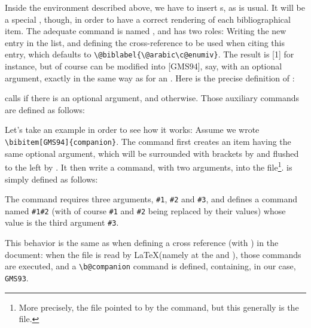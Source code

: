 Inside the  environment described above, we have to insert
s, as is usual. It will be a special , though, in
order to have a correct rendering of each bibliographical item. The
adequate command is named , and has two roles: Writing
the new entry in the list, and defining the cross-reference to be used
when citing this entry, which defaults to 
\verb+\@biblabel{\@arabic\c@enumiv}+. The result is [1] for instance,
but of course can be modified into [GMS94], say, 
with an optional argument,
exactly in the same way as for an .
Here is the precise definition of :
\begin{listing}{1}
\def\bibitem{\@ifnextchar[\@lbibitem\@bibitem}
\end{listing}
 calls  if
there is an optional argument, and  otherwise.
Those auxiliary commands are defined as follows:
%
\begin{listing}{1}
\def\@lbibitem[#1]#2{\item[\@biblabel{#1}\hfill]\if@filesw
      {\let\protect\noexpand
       \immediate
       \write\@auxout{\string\bibcite{#2}{#1}}}\fi\ignorespaces}
\end{listing}
%
Let's take an example in order to see how it works: Assume we wrote 
\verb+\bibitem[GMS94]{companion}+.
The command first creates an item having the same optional argument,
which will be surrounded with brackets by  and flushed
to the left by .\label{biblabel}
It then write a  command, with two arguments, into the
 file\footnote{More precisely, the file pointed to by
the  command, but this generally is the 
file.}.  
 is simply defined as follows:
\label{bibcite}
\begin{listing}{1}
\def\bibcite{\@newl@bel b}
\end{listing}

The  command requires three arguments, \texttt{\#1},
 \texttt{\#2} and \texttt{\#3}, and defines a command named
 \texttt{\#1\at\#2} (with of course \texttt{\#1} and \texttt{\#2} being
 replaced by their values) whose value is the third argument \texttt{\#3}.

This behavior is the same as when defining a cross reference (with
) in the document: when the  file is read by
\LaTeX (namely at the \verb++ and
\verb++), those  commands are 
executed, and a \verb+\b@companion+ command is defined, containing,
in our case, \texttt{GMS93}. 

